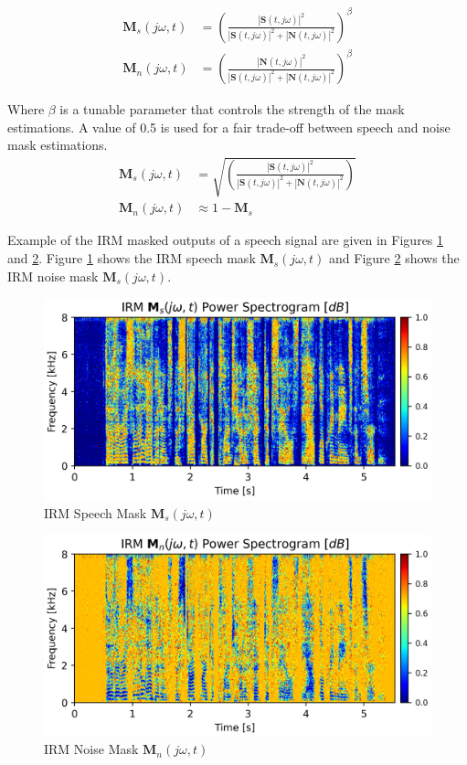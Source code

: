 \begin{align}
    \label{eq:irm_speech}\mathbf{M}_{s}(j\omega, t) & = {\left( \frac{|\mathbf{S}(t,j\omega)|^2}{|\mathbf{S}(t,j\omega)|^2 + |\mathbf{N}(t,j\omega)|^2} \right)}^{\beta} \\
    \label{eq:irm_noise}\mathbf{M}_{n}(j\omega, t) & = {\left( \frac{|\mathbf{N}(t,j\omega)|^2}{|\mathbf{S}(t,j\omega)|^2 + |\mathbf{N}(t,j\omega)|^2} \right)}^{\beta}
\end{align}
 
Where \(\beta \) is a tunable parameter that 
controls the strength of the mask estimations. 
A value of 0.5 is used 
for a fair trade-off between speech and noise mask estimations.
%
\begin{align}
    \mathbf{M}_{s}(j\omega, t) & = \sqrt{\left( \frac{|\mathbf{S}(t,j\omega)|^2}{|\mathbf{S}(t,j\omega)|^2 + |\mathbf{N}(t,j\omega)|^2} \right)} \\
    \mathbf{M}_{n}(j\omega, t) & \approx 1 - \mathbf{M}_{s}
\end{align}

Example of the IRM masked outputs of a speech signal
are given in Figures \ref{fig:irm_mask} and \ref{fig:irm_mask_noise}. 
Figure \ref{fig:irm_mask} shows the IRM speech mask \(\mathbf{M}_{s}(j\omega, t)\)
and Figure \ref{fig:irm_mask_noise} shows the IRM noise mask \(\mathbf{M}_{s}(j\omega, t)\).

\begin{figure}[H]
    \centering
    \includegraphics[width=\linewidth]{Features/images/irm_mask}
    \caption{IRM Speech Mask \(\mathbf{M}_{s}(j\omega, t)\)}\label{fig:irm_mask}
\end{figure}
\begin{figure}[H]
    \centering
    \includegraphics[width=\linewidth]{Features/images/irm_mask_noise}
    \caption{IRM Noise Mask \(\mathbf{M}_{n}(j\omega, t)\)}\label{fig:irm_mask_noise}
\end{figure}

